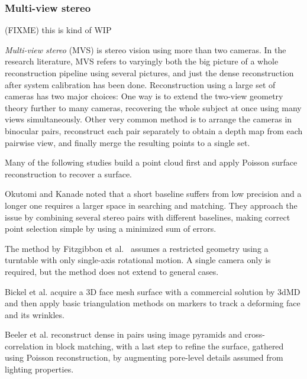 
\subsubsection{Multi-view stereo} %


{ \color{red} (FIXME) this is kind of WIP }

\emph{Multi-view stereo} (MVS) is stereo vision using more than two cameras.
In the research literature, MVS refers to varyingly both the big picture of a whole reconstruction pipeline using several pictures, and just the dense reconstruction after system calibration has been done.
Reconstruction using a large set of cameras has two major choices:
One way is to extend the two-view geometry theory further to many cameras, recovering the whole subject at once using many views simultaneously.
Other very common method is to arrange the cameras in binocular pairs, reconstruct each pair separately to obtain a depth map from each pairwise view, and finally merge the resulting points to a single set.

Many of the following studies build a point cloud first and apply Poisson surface reconstruction to recover a surface. \cite{kazhdan2006poisson}

Okutomi and Kanade \cite{okutomi1993multiple} noted that a short baseline suffers from low precision and a longer one requires a larger space in searching and matching.
They approach the issue by combining several stereo pairs with different baselines, making correct point selection simple by using a minimized sum of errors.

The method by Fitzgibbon et al.\ \cite{fitzgibbon1998automatic} assumes a restricted geometry using a turntable with only single-axis rotational motion.
A single camera only is required, but the method does not extend to general cases.

Bickel et al. acquire a 3D face mesh surface with a commercial solution by 3dMD \cite{3dmd} and then apply basic triangulation methods on markers to track a deforming face and its wrinkles. \cite{bickel2007multi}

Beeler et al. reconstruct dense in pairs using image pyramids and cross-correlation in block matching, with a last step to refine the surface, gathered using Poisson reconstruction, by augmenting pore-level details assumed from lighting properties. \cite{beeler2010high}

